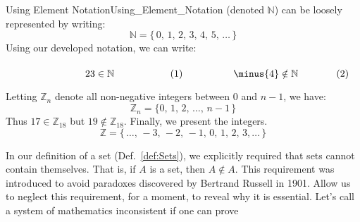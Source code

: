 \begin{fexample}{Using Element Notation}{Using_Element_Notation}
        (denoted $\mathbb{N}$) can be loosely represented by writing:
        \begin{equation}
            \label{eqn:Natural_Numbers_Ellipses}%
            \mathbb{N}=\{\,0,\,1,\,2,\,3,\,4,\,5,\,\dots\,\}
        \end{equation}
        Using our developed notation, we can write:
        \par\hfill\par
        \begin{subequations}
            \begin{minipage}[b]{0.49\textwidth}
                \begin{equation}
                    23\in\mathbb{N}
                \end{equation}
            \end{minipage}
            \hfill
            \begin{minipage}[b]{0.49\textwidth}
                \begin{equation}
                    \minus{4}\notin\mathbb{N}
                \end{equation}
            \end{minipage}
        \end{subequations}
        \par\vspace{2.5ex}
        Letting $\mathbb{Z}_{n}$ denote all non-negative integers
        between $0$ and $n-1$, we have:
        \begin{equation}
            \label{eqn:Z_n_Ellipses}%
            \mathbb{Z}_{n}=\{0,\,1,\,2,\,\dots,\,n-1\,\}
        \end{equation}
        Thus $17\in\mathbb{Z}_{18}$ but $19\notin\mathbb{Z}_{18}$.
        Finally, we present the integers.
        \begin{equation}
            \label{eqn:Integers_Ellipses}%
            \mathbb{Z}=\{\,\dots,\,\minus{3},\,\minus{2},\,\minus{1},
                            \,0,\,1,\,2,\,3,\dots\,\}
        \end{equation}
    \end{fexample}
    In our definition of a set (Def.~\ref{def:Sets}), we explicitly
    required that sets cannot contain themselves. That is, if
    $A$ is a set, then $A\notin{A}$. This requirement was introduced to
    avoid paradoxes discovered by Bertrand Russell in 1901. Allow us to
    neglect this requirement, for a moment, to reveal why it is essential.
    Let's call a system of mathematics inconsistent if one can prove
